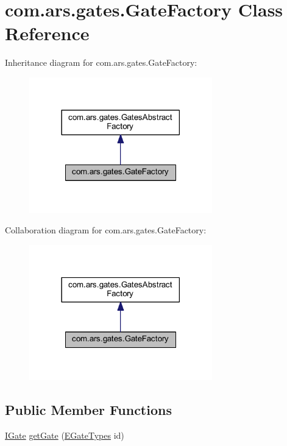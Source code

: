 \hypertarget{classcom_1_1ars_1_1gates_1_1_gate_factory}{}\section{com.\+ars.\+gates.\+Gate\+Factory Class Reference}
\label{classcom_1_1ars_1_1gates_1_1_gate_factory}


Inheritance diagram for com.\+ars.\+gates.\+Gate\+Factory\+:\nopagebreak
\begin{figure}[H]
\begin{center}
\leavevmode
\includegraphics[width=225pt]{classcom_1_1ars_1_1gates_1_1_gate_factory__inherit__graph}
\end{center}
\end{figure}


Collaboration diagram for com.\+ars.\+gates.\+Gate\+Factory\+:\nopagebreak
\begin{figure}[H]
\begin{center}
\leavevmode
\includegraphics[width=225pt]{classcom_1_1ars_1_1gates_1_1_gate_factory__coll__graph}
\end{center}
\end{figure}
\subsection*{Public Member Functions}
\begin{DoxyCompactItemize}
\item 
\hyperlink{interfacecom_1_1ars_1_1gates_1_1_i_gate}{I\+Gate} \hyperlink{classcom_1_1ars_1_1gates_1_1_gate_factory_a3a60759187c2a81cd1fec2ac7d3c847c}{get\+Gate} (\hyperlink{enumcom_1_1ars_1_1gates_1_1_e_gate_types}{E\+Gate\+Types} id)
\end{DoxyCompactItemize}


